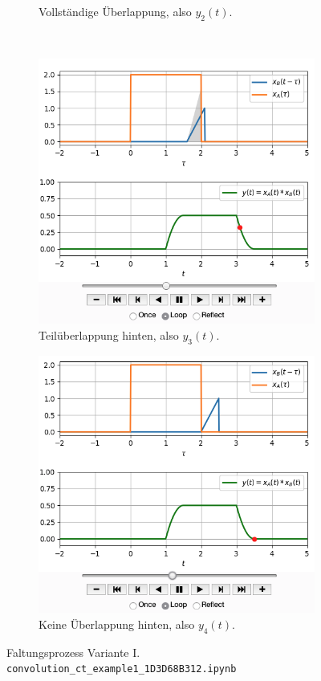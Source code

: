 \begin{figure}[h!]
\begin{subfigure}{0.45\textwidth}
\caption{Vollständige Überlappung, also $y_2(t)$.}
\label{fig:1D3D68B312_v1_2}
\end{subfigure}
\\
\begin{subfigure}{0.45\textwidth}
\centering
\includegraphics[width=\textwidth]{../convolution_ct/conv_var1_3_1D3D68B312.png}
\caption{Teilüberlappung hinten, also $y_3(t)$.}
\label{fig:1D3D68B312_v1_3}
\end{subfigure}
\begin{subfigure}{0.45\textwidth}
\centering
\includegraphics[width=\textwidth]{../convolution_ct/conv_var1_4_1D3D68B312.png}
\caption{Keine Überlappung hinten, also $y_4(t)$.}
\label{fig:1D3D68B312_v1_4}
\end{subfigure}
%
\caption{Faltungsprozess Variante I.
\texttt{convolution\_ct\_example1\_1D3D68B312.ipynb}}
\label{fig:1D3D68B312_v1}
\end{figure}


